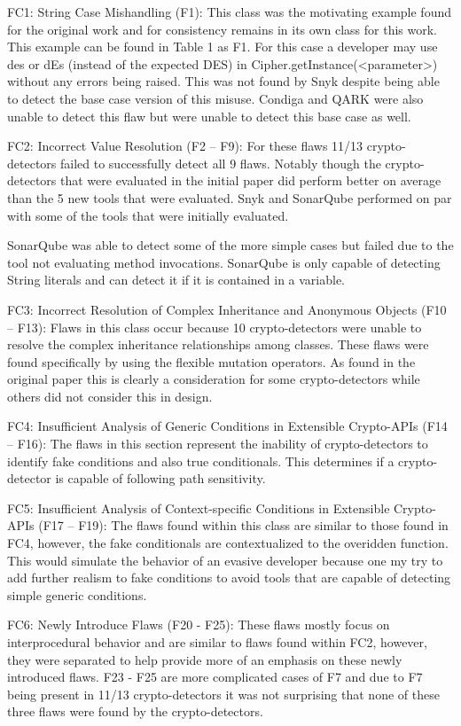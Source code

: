 FC1: String Case Mishandling (F1): This class was the motivating example found for the original work and for consistency remains in its own class for this work. This example can be found in Table 1 as F1. For this case a developer may use des or dEs (instead of the expected DES) in Cipher.getInstance(<parameter>) without any errors being raised. This was not found by Snyk despite being able to detect the base case version of this misuse. Condiga and QARK were also unable to detect this flaw but were unable to detect this base case as well.

FC2: Incorrect Value Resolution (F2 – F9): For these flaws 11/13 crypto-detectors failed to successfully detect all 9 flaws. Notably though the crypto-detectors that were evaluated in the initial paper did perform better on average than the 5 new tools that were evaluated. Snyk and SonarQube performed on par with some of the tools that were initially evaluated. 

SonarQube was able to detect some of the more simple cases but failed due to the tool not evaluating method invocations. SonarQube is only capable of detecting String literals and can detect it if it is contained in a variable. 

FC3: Incorrect Resolution of Complex Inheritance and Anonymous Objects (F10 – F13): Flaws in this class occur because 10 crypto-detectors were unable to resolve the complex inheritance relationships among classes. These flaws were found specifically by using the flexible mutation operators. As found in the original paper this is clearly a consideration for some crypto-detectors while others did not consider this in design. 

FC4: Insufficient Analysis of Generic Conditions in Extensible Crypto-APIs (F14 – F16): The flaws in this section represent the inability of crypto-detectors to identify fake conditions and also true conditionals. This determines if a crypto-detector is capable of following path sensitivity.

FC5: Insufficient Analysis of Context-specific Conditions in Extensible Crypto-APIs (F17 – F19): The flaws found within this class are similar to those found in FC4, however, the fake conditionals are contextualized to the overidden function. This would simulate the behavior of an evasive developer because one my try to add further realism to fake conditions to avoid tools that are capable of detecting simple generic conditions.

FC6: Newly Introduce Flaws (F20 - F25): These flaws mostly focus on interprocedural behavior and are similar to flaws found within FC2, however, they were separated to help provide more of an emphasis on these newly introduced flaws. F23 - F25 are more complicated cases of F7 and due to F7 being present in 11/13 crypto-detectors it was not surprising that none of these three flaws were found by the crypto-detectors.

